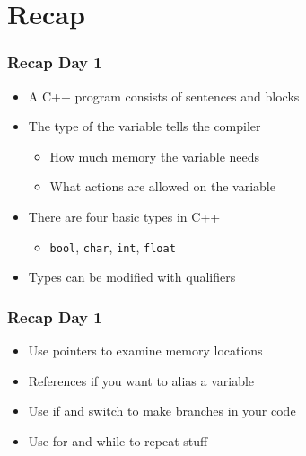 \documentclass[14pt,a4paper,dvipsnames,usenames]{beamer}
\begin{document}
\section{Recap}

\frame[plain]{\sectionpage}

\begin{frame}[fragile]
  \frametitle{Recap Day 1}

  \begin{itemize}
    \setlength\itemsep{0.5em}
    \item A C++ program consists of {\color{Marty}sentences} and {\color{Marty}blocks}
    \item The type of the variable tells the compiler
    \vspace{.3em}
    \begin{itemize}
    \setlength\itemsep{0.5em}
      \item How much memory the variable needs
      \item What actions are allowed on the variable
    \end{itemize}
    \item There are four basic types in C++
    \vspace{.3em}
    \begin{itemize}
    \setlength\itemsep{0.5em}
      \item \lstinline!bool!, \lstinline!char!, \lstinline!int!, \lstinline!float!
    \end{itemize}
    \item Types can be modified with qualifiers
  \end{itemize}
  
\end{frame}

\begin{frame}[fragile]
  \frametitle{Recap Day 1}

  \begin{itemize}
    \setlength\itemsep{0.5em}
    \item Use pointers to examine memory locations
    \item References if you want to alias a variable
    \item Use {\color{FeebleWeek}if} and {\color{FeebleWeek}switch} to make branches in your code
    \item Use {\color{Marty}for} and {\color{Marty}while} to repeat stuff
  \end{itemize}
  
\end{frame}
\end{document}
